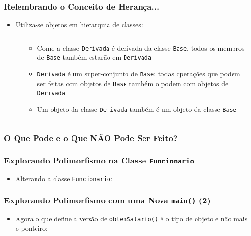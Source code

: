 \documentclass[aspectratio=169]{beamer}
\begin{document}
\begin{frame}[fragile]\frametitle{Relembrando o Conceito de Herança...}
\begin{itemize}
	\item Utiliza-se objetos em hierarquia de classes:
\begin{columns}
\begin{column}{0.5\linewidth}

\end{column}
\begin{column}{0.5\linewidth}
\begin{itemize}
	\item Como a classe \texttt{Derivada} é derivada da classe \texttt{Base}, todos os membros de \texttt{Base} também estarão em \texttt{Derivada}
	\item \texttt{Derivada} é um super-conjunto de \texttt{Base}: todas operações que podem ser feitas com objetos de \texttt{Base} também o podem com objetos de \texttt{Derivada}
	\item Um objeto da classe \texttt{Derivada} também é um objeto da classe \texttt{Base}
\end{itemize}
\end{column}
\end{columns}
\end{itemize}
\end{frame}

\begin{frame}[fragile]\frametitle{O Que Pode e o Que NÃO Pode Ser Feito?}

\end{frame}

\begin{frame}[fragile]\frametitle{Explorando Polimorfismo na Classe \texttt{Funcionario}}
\begin{itemize}
\item Alterando a classe \texttt{Funcionario}:

\end{itemize}
\end{frame}

\begin{frame}[fragile]\frametitle{Explorando Polimorfismo com uma Nova \texttt{main()} (2)}
\begin{itemize}
\item Agora o que define a versão de \texttt{obtemSalario()} é o tipo de objeto e não mais o ponteiro:

\end{itemize}
\end{frame}
\end{document}
